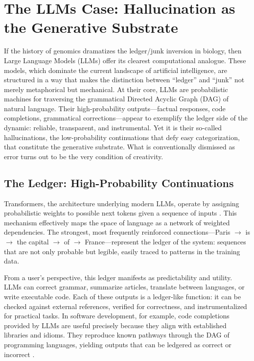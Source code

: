 \documentclass[12pt]{article}
\begin{document}
{{{\section{The LLMs Case: Hallucination as the Generative Substrate}

If the history of genomics dramatizes the ledger/junk inversion in biology, then Large Language Models (LLMs) offer its clearest computational analogue. These models, which dominate the current landscape of artificial intelligence, are structured in a way that makes the distinction between ``ledger'' and ``junk'' not merely metaphorical but mechanical. At their core, LLMs are probabilistic machines for traversing the grammatical Directed Acyclic Graph (DAG) of natural language. Their high-probability outputs---factual responses, code completions, grammatical corrections---appear to exemplify the ledger side of the dynamic: reliable, transparent, and instrumental. Yet it is their so-called hallucinations, the low-probability continuations that defy easy categorization, that constitute the generative substrate. What is conventionally dismissed as error turns out to be the very condition of creativity.

\subsection{The Ledger: High-Probability Continuations}
Transformers, the architecture underlying modern LLMs, operate by assigning probabilistic weights to possible next tokens given a sequence of inputs \citep{vaswani2017}. This mechanism effectively maps the space of language as a network of weighted dependencies. The strongest, most frequently reinforced connections---Paris $\to$ is $\to$ the capital $\to$ of $\to$ France---represent the ledger of the system: sequences that are not only probable but legible, easily traced to patterns in the training data.

From a user’s perspective, this ledger manifests as predictability and utility. LLMs can correct grammar, summarize articles, translate between languages, or write executable code. Each of these outputs is a ledger-like function: it can be checked against external references, verified for correctness, and instrumentalized for practical tasks. In software development, for example, code completions provided by LLMs are useful precisely because they align with established libraries and idioms. They reproduce known pathways through the DAG of programming languages, yielding outputs that can be ledgered as correct or incorrect \citep{chen2021}.

}}}
\end{document}
